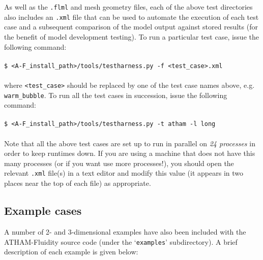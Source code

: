 \documentclass[10pt,a4paper]{article}
\newcommand\tab[1][0.5cm]{\hspace*{#1}}
\begin{document}
As well as the \texttt{.flml} and mesh geometry files, each of the above test directories also includes an \texttt{.xml} file that can be used to automate the execution of each test case and a subsequent comparison of the model output against stored results (for the benefit of model development testing). To run a particular test case, issue the following command:\\\\
\tab \texttt{\$ <A-F\_install\_path>/tools/testharness.py -f <test\_case>.xml}\\\\
where \texttt{<test\_case>} should be replaced by one of the test case names above, e.g. \texttt{warm\_bubble}. To run all the test cases in succession, issue the following command:\\\\
\tab \texttt{\$ <A-F\_install\_path>/tools/testharness.py -t atham -l long}\\\\
Note that all the above test cases are set up to run in parallel on \textit{24 processes} in order to keep runtimes down. If you are using a machine that does not have this many processes (or if you want use more processes!), you should open the relevant \texttt{.xml} file(s) in a text editor and modify this value (it appears in two places near the top of each file) as appropriate. 

\subsection{Example cases}
A number of 2- and 3-dimensional examples have also been included with the ATHAM-Fluidity source code (under the `\texttt{examples}' subdirectory). A brief description of each example is given below:
\end{document}
